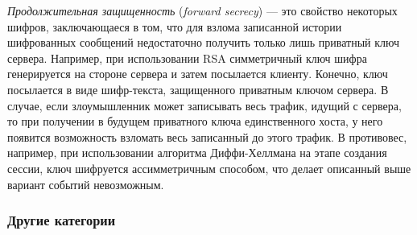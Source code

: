 \emph{Продолжительная защищенность} (\emph{forward secrecy}) --- это свойство некоторых шифров, заключающаеся в том, что для взлома 
записанной истории шифрованных сообщений недостаточно получить только лишь приватный ключ сервера. Например, при использовании RSA 
симметричный ключ шифра генерируется на стороне сервера и затем посылается клиенту. Конечно, ключ посылается в виде шифр-текста, 
защищенного приватным ключом сервера. В случае, если злоумышленник может записывать весь трафик, идущий с сервера, то при получении
в будущем приватного ключа единственного хоста, у него появится возможность взломать весь записанный до этого трафик. В противовес,
например, при использовании алгоритма Диффи-Хеллмана на этапе создания сессии, ключ шифруется ассимметричным способом, что делает
описанный выше вариант событий невозможным. 

\subsubsection{Другие категории}

